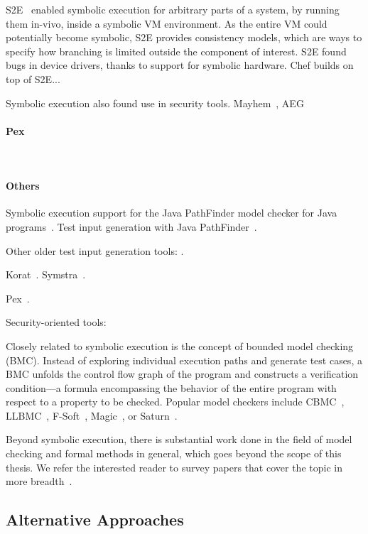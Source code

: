 S2E~\cite{s2eSystem} enabled symbolic execution for arbitrary parts of a system, by running them in-vivo, inside a symbolic VM environment.  As the entire VM could potentially become symbolic, S2E provides consistency models, which are ways to specify how branching is limited outside the component of interest.  S2E found bugs in device drivers, thanks to support for symbolic hardware.
%
Chef builds on top of S2E...

Symbolic execution also found use in security tools.  Mayhem~\cite{mayhem}, AEG~\cite{aeg}


\paragraph{Pex}~\cite{tillmann-pex}

\paragraph{Others}

Symbolic execution support for the Java PathFinder model checker for Java programs~\cite{jpf-symbex}.  Test input generation with Java PathFinder~\cite{jpf-testgen}.

Other older test input generation tools: \cite{genptrinputs}.

Korat~\cite{boyapati:korat}. Symstra~\cite{xie:symstra}.

Pex~\cite{tillmann-pex}.

Security-oriented tools: 

Closely related to symbolic execution is the concept of bounded model checking (BMC).  Instead of exploring individual execution paths and generate test cases, a BMC unfolds the control flow graph of the program and constructs a verification condition---a formula encompassing the behavior of the entire program with respect to a property to be checked.  Popular model checkers include CBMC~\cite{cbmc}, LLBMC~\cite{llbmc2012}, F-Soft~\cite{f-soft}, Magic~\cite{magic}, or Saturn~\cite{saturn}.

Beyond symbolic execution, there is substantial work done in the field of model checking and formal methods in general, which goes beyond the scope of this thesis.  We refer the interested reader to survey papers that cover the topic in more breadth~\cite{jhala2009software, woodcock2009formal}.

\subsection{Alternative Approaches}

